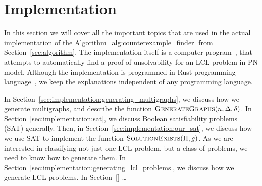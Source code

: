 
\section{Implementation} \label{sec:implementation}
In this section we will cover all the important topics that are used in the actual implementation of the Algorithm~\ref{alg:counterexample_finder} from Section~\ref{sec:algorithm}.
The implementation itself is a computer program~\cite{NonconstantLclClassifier2022}, that attempts to automatically find a proof of unsolvability for an LCL problem in PN model.
Although the implementation is programmed in Rust programming language~\cite{RustLang}, we keep the explanations independent of any programming language.

In Section~\ref{sec:implementation:generating_multigraphs}, we discuss how we generate multigraphs, and describe the function $\textsc{GenerateGraphs}(n, \Delta, \delta)$.
In Section~\ref{sec:implementation:sat}, we discuss Boolean satisfiability problems (SAT) generally.
Then, in Section~\ref{sec:implementation:our_sat}, we discuss how we use SAT to implement the function $\textsc{SolutionExists}(\Pi, g)$.
As we are interested in classifying not just one LCL problem, but a class of problems, we need to know how to generate them.
In Section~\ref{sec:implementation:generating_lcl_problems}, we discuss how we generate LCL problems.
In Section~\ref{} \dots





